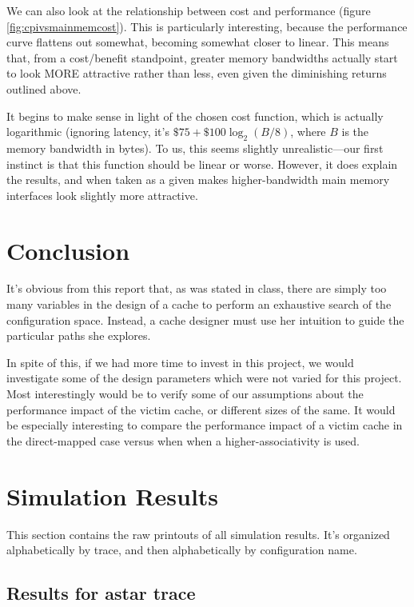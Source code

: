 \documentclass{article}
\begin{document}
We can also look at the relationship between cost and performance (figure
\ref{fig:cpivsmainmemcost}). This is particularly interesting, because the
performance curve flattens out somewhat, becoming somewhat closer to linear.
This means that, from a cost/benefit standpoint, greater memory bandwidths
actually start to look MORE attractive rather than less, even given the
diminishing returns outlined above.

It begins to make sense in light of the chosen cost function, which is actually
logarithmic (ignoring latency, it's $\$75 + \$100 \log_2(B / 8)$, where $B$ is
the memory bandwidth in bytes). To us, this seems slightly unrealistic---our
first instinct is that this function should be linear or worse. However, it does
explain the results, and when taken as a given makes higher-bandwidth main
memory interfaces look slightly more attractive.

\section{Conclusion}

It's obvious from this report that, as was stated in class, there are simply too
many variables in the design of a cache to perform an exhaustive search of the
configuration space. Instead, a cache designer must use her intuition to guide
the particular paths she explores.

In spite of this, if we had more time to invest in this project, we would
investigate some of the design parameters which were not varied for this
project. Most interestingly would be to verify some of our assumptions about the
performance impact of the victim cache, or different sizes of the same.
It would be especially interesting to compare the performance impact of a victim
cache in the direct-mapped case versus when when a higher-associativity is used.

\clearpage
\appendix
\section{Simulation Results}

This section contains the raw printouts of all simulation results. It's
organized alphabetically by trace, and then alphabetically by configuration
name.

\clearpage
\subsection{Results for astar trace}
\end{document}
